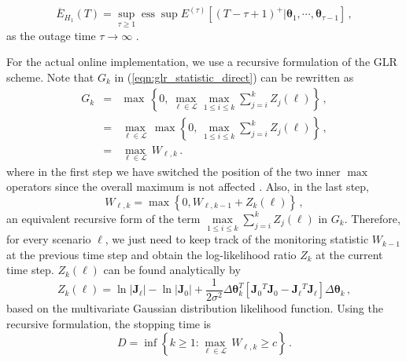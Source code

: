 \begin{equation}
\overline{E}_{H_1}(T)=\sup _{\tau \geq 1} \operatorname{ess} \sup E^{(\tau)}\left[(T-\tau+1)^{+} | \boldsymbol{\theta}_{1}, \cdots, \boldsymbol{\theta}_{\tau-1}\right] \,,
\end{equation} as the outage time $\tau \to \infty$ \cite{Lai1998}.

For the actual online implementation, we use a recursive formulation of the GLR scheme. Note that $G_k$ in (\ref{eqn:glr_statistic_direct}) can be rewritten as 
\begin{eqnarray}
G_k &=& \max \, \left\lbrace  0,  \, \underset{\ell \in \mathcal{L}}{\max} \underset{1\le i \le k}{\max} \sum_{j=i}^{k} Z_{j}(\ell)  \right\rbrace\,, \nonumber\\
    &=& \underset{\ell \in \mathcal{L}}{\max} \, \max \left\lbrace  0,  \, \underset{1\le i \le k}{\max} \sum_{j=i}^{k} Z_{j}(\ell)  \right\rbrace\,,\nonumber \\
    &=& \underset{\ell \in \mathcal{L}}{\max}  \,  W_{\ell, k} \,.
\end{eqnarray} 
where in the first step we have switched the position of the two inner $\max$ operators since the overall maximum is not affected \cite{Mei2010}. Also, in the last step,
\begin{equation}
\label{eqn:glr_statistics}
W_{\ell, k} = \max \left\lbrace  0, W_{\ell, k-1} + Z_k(\ell) \right\rbrace \,,
\end{equation}
an equivalent recursive form of the term $\underset{1\le i \le k}{\max} \sum_{j=i}^{k} Z_{j}(\ell) $ in $G_k$. Therefore, for every scenario $\ell$, we just need to keep track of the monitoring statistic $W_{k-1}$ at the previous time step and obtain the log-likelihood ratio $Z_k$ at the current time step. $Z_k(\ell)$ can be found analytically by
\begin{equation}
\label{eqn:log_likelihood_explicit}
Z_k(\ell) = \ln\left| \mathbf{J}_\ell \right| - \ln\left| \mathbf{J}_0 \right| + \frac{1}{2\sigma^2} \Delta\boldsymbol{\theta}_k^{T} \left[ \mathbf{J}_0{^T}  \mathbf{J}_0 - \mathbf{J}_\ell{^T} \mathbf{J}_\ell \right] \Delta\boldsymbol{\theta}_k \,,
\end{equation} based on the multivariate Gaussian distribution likelihood function. Using the recursive formulation, the stopping time is
\begin{equation}
\label{eqn:stopping_rule}
    D = \inf \left\lbrace  k \ge 1: \underset{\ell \in \mathcal{L}}{\max} \, W_{\ell, k} \ge c \right\rbrace \,.
\end{equation}

